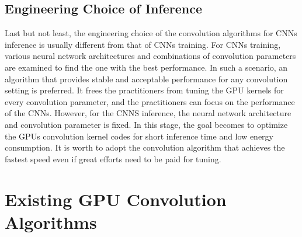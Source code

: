 \documentclass{article}
\begin{document}



\subsection{Engineering Choice of Inference}

Last but not least, the engineering choice of the convolution algorithms for CNNs inference is usually different from that of CNNs training. For CNNs training, various neural network architectures and combinations of convolution parameters are examined to find the one with the best performance. In such a scenario, an algorithm that provides stable and acceptable performance for any convolution setting is preferred. It frees the practitioners from tuning the GPU kernels for every convolution parameter, and the practitioners can focus on the performance of the CNNs. However, for the CNNS inference, the neural network architecture and convolution parameter is fixed. In this stage, the goal becomes to optimize the GPUs convolution kernel codes for short inference time and low energy consumption. It is worth to adopt the convolution algorithm that achieves the fastest speed even if great efforts need to be paid for tuning.





\section{Existing GPU Convolution Algorithms}
\end{document}
